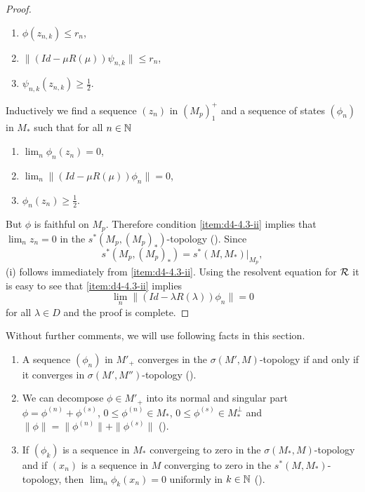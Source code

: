\begin{proof}
\begin{enumerate}[label=(\roman*$^{\prime}$)]
\item
$ \phi(z_{n,k}) \leq r_{n} $,

\item
$ \|(Id - \mu R(\mu))\psi_{n,k}\| \leq r_{n} $,

\item
$ \psi_{n,k}(z_{n,k}) \geq \frac{1}{2} $. 
\end{enumerate}
Inductively we find a sequence $ (z_{n}) $  in $ (M_{p})_{1}^{+} $  and a sequence of states $ (\phi_{n}) $  in $ M_{*} $  such that for all $ n \in \mathbb{N} $ 
\begin{enumerate}[label=(\roman*$^{\prime\prime}$)]
\item
$ \lim_{n} \phi_{n}(z_{n}) = 0 $, 

\item\label{item:d4-4.3-ii}
$ \lim_{n} \|(Id - \mu R(\mu))\phi_{n}\| = 0 $, 

\item
$ \phi_{n}(z_{n}) \geq \frac{1}{2} $.
\end{enumerate}
But $ \phi $  is faithful on $ M_{p} $.
Therefore condition \ref{item:d4-4.3-ii} implies that $ \lim_{n} z_{n} = 0 $  in the $ s^{*}(M_{p},(M_{p})_{*}) $-topology (\citet[Proposition III.5.4]{takesaki:1979}).
Since 
%
\[
	s^{*}(M_{p},(M_{p})_{*}) = s^{*}(M,M_{*})|_{M_{p}} ,
\]
%
(i) follows immediately from \ref{item:d4-4.3-ii}.
Using the resolvent equation for $ \mathcal{R} $  it is easy to see that \ref{item:d4-4.3-ii} implies
\[
\lim_{n} \|(Id - \lambda R(\lambda))\phi_{n}\| = 0
\]
for all $ \lambda \in D $  and the proof is complete.
\end{proof}
Without further comments, we will use following facts in this section.
\begin{enumerate}[(1)]
\item
A sequence $ (\phi_{n}) $  in $ M'_{+} $  converges in the $ \sigma(M',M) $-topology if and only if it converges in $ \sigma(M',M'') $-topology (\citet{akemannetal:1972}).

\item
We can decompose $ \phi \in M'_{+} $  into its normal and singular part $ \phi = \phi^{(n)} + \phi^{(s)} $, $ 0 \leq \phi^{(n)} \in M_{*} $, $ 0 \leq \phi^{(s)} \in M_*^{\perp} $  and $ \|\phi\| = \|\phi^{(n)}\| + \|\phi^{(s)}\| $  (\citet[Theorem III.2.14]{takesaki:1979}).

\item
If $ (\phi_{k}) $  is a sequence in $ M_{*} $  convergeing to zero in the $ \sigma(M_{*},M) $-topology and if $ (x_{n}) $  is a sequence in $ M $  converging to zero in the $ s^{*}(M,M_{*}) $-topology, then $ \lim_{n} \phi_{k}(x_{n}) = 0 $  uniformly in $ k \in \mathbb{N} $  (\citet[Lemma III.5.5]{takesaki:1979}).
\end{enumerate}
